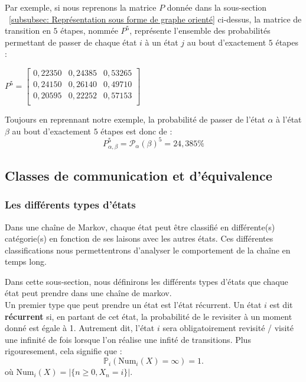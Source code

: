 \documentclass{article}
\begin{document}
Par exemple, si nous reprenons la matrice $P$ donnée dans la sous-section ~\ref{subsubsec: Représentation sous forme de graphe orienté} ci-dessus, la matrice de transition en $5$ étapes, nommée $P^{5}$, représente l'ensemble des probabilités permettant de passer de chaque état $i$ à un état $j$ au bout d'exactement $5$ étapes :
\begin{center}
$
P^{5} = \begin{bmatrix}
0,22350 & 0,24385 & 0,53265 \\
0,24150 & 0,26140 & 0,49710 \\
0,20595 & 0,22252 & 0,57153 \\
\end{bmatrix}
$
\end{center}
Toujours en reprennant notre exemple, la probabilité de passer de l'état $\alpha$ à l'état $\beta$ au bout d'exactement $5$ étapes est donc de :
\[
P_{\alpha,\beta}^{5} = \mathcal{P}_\alpha(\beta)^{5} = 24,385\%
\]

\subsection{Classes de communication et d'équivalence}

\subsubsection{Les différents types d'états}
\label{subsubsec: Les différents types d'états}

Dans une chaîne de Markov, chaque état peut être classifié en différente(s) catégorie(s) en fonction de ses laisons avec les autres états. Ces différentes classifications nous permettentrons d'analyser le comportement de la chaîne en temps long.

Dans cette sous-section, nous définirons les différents types d'états que chaque état peut prendre dans une chaîne de markov. \\ %

Un premier type que peut prendre un état est l'état récurrent.
Un état $i$ est dit \textbf{récurrent} si, en partant de cet état, la probabilité de le revisiter à un moment donné est égale à 1. Autrement dit, l'état $i$ sera obligatoirement revisité / visité une infinité de fois lorsque l'on réalise une infité de transitions. Plus rigouresement, cela signifie que :
\[
\mathbb{P}_i(\text{Num}_i(X) = \infty) = 1.
\]
où $\text{Num}_i(X) = |\{n \geq 0, X_n = i\}|$.
\end{document}
